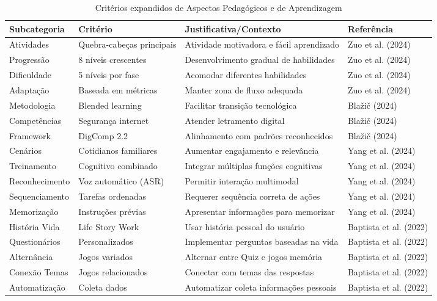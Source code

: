 \begin{table}[H]
\begin{table}[H]
\centering
\caption{Critérios expandidos de Aspectos Pedagógicos e de Aprendizagem}
\label{tab:pedagogicos_expandida}
\begin{tabular}{p{2.5cm}p{3.5cm}p{4.5cm}p{2.5cm}}
\hline
\textbf{Subcategoria} & \textbf{Critério} & \textbf{Justificativa/Contexto} & \textbf{Referência} \\ \hline
Atividades & Quebra-cabeças principais & Atividade motivadora e fácil aprendizado & Zuo et al. (2024) \\
Progressão & 8 níveis crescentes & Desenvolvimento gradual de habilidades & Zuo et al. (2024) \\
Dificuldade & 5 níveis por fase & Acomodar diferentes habilidades & Zuo et al. (2024) \\
Adaptação & Baseada em métricas & Manter zona de fluxo adequada & Zuo et al. (2024) \\
Metodologia & Blended learning & Facilitar transição tecnológica & Blažič (2024) \\
Competências & Segurança internet & Atender letramento digital & Blažič (2024) \\
Framework & DigComp 2.2 & Alinhamento com padrões reconhecidos & Blažič (2024) \\
Cenários & Cotidianos familiares & Aumentar engajamento e relevância & Yang et al. (2024) \\
Treinamento & Cognitivo combinado & Integrar múltiplas funções cognitivas & Yang et al. (2024) \\
Reconhecimento & Voz automático (ASR) & Permitir interação multimodal & Yang et al. (2024) \\
Sequenciamento & Tarefas ordenadas & Requerer sequência correta de ações & Yang et al. (2024) \\
Memorização & Instruções prévias & Apresentar informações para memorizar & Yang et al. (2024) \\
História Vida & Life Story Work & Usar história pessoal do usuário & Baptista et al. (2022) \\
Questionários & Personalizados & Implementar perguntas baseadas na vida & Baptista et al. (2022) \\
Alternância & Jogos variados & Alternar entre Quiz e jogos memória & Baptista et al. (2022) \\
Conexão Temas & Jogos relacionados & Conectar com temas das respostas & Baptista et al. (2022) \\
Automatização & Coleta dados & Automatizar coleta informações pessoais & Baptista et al. (2022) \\

\end{tabular}
\end{table}
\end{table}
